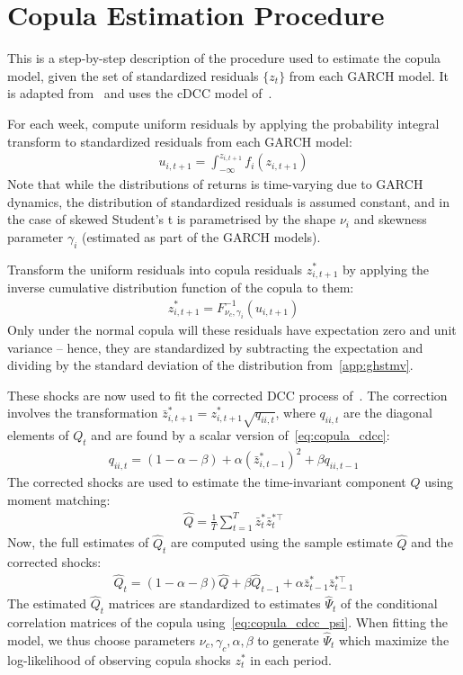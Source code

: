 
\section{Copula Estimation Procedure} %
\label{app:copula_cdcc}

This is a step-by-step description of the procedure used to estimate the copula model, given the set of standardized residuals $\{z_{t}\}$ from each GARCH model. It is adapted from~\textcite{ChristoffersenErrunzaJacobLanglois2012} and uses the cDCC model of~\textcite{Aielli2013}.

For each week, compute uniform residuals by applying the probability integral transform to standardized residuals from each GARCH model:
\begin{align}
  u_{i, t+1} = \int_{-\infty}^{z_{i,t+1}} f_{i}(z_{i,t+1})
\end{align}
Note that while the distributions of returns is time-varying due to GARCH dynamics, the distribution of standardized residuals is assumed constant, and in the case of skewed Student's t is parametrised by the shape $\nu_i$ and skewness parameter $\gamma_i$ (estimated as part of the GARCH models).

Transform the uniform residuals into copula residuals $z_{i,t+1}^*$ by applying the inverse cumulative distribution function of the copula to them:
\begin{align}
  z_{i,t+1}^* = F_{\nu_c,\gamma_i}^{-1}(u_{i,t+1})
\end{align}
Only under the normal copula will these residuals have expectation zero and unit variance -- hence, they are standardized by subtracting the expectation and dividing by the standard deviation of the distribution from~\autoref{app:ghstmv}.

These shocks are now used to fit the corrected DCC process of~\textcite{Aielli2013}. The correction involves the transformation $\bar{z}_{i,t+1}^* = z_{i,t+1}^* \sqrt{q_{ii,t}}$, where $q_{ii,t}$ are the diagonal elements of $Q_t$ and are found by a scalar version of~\autoref{eq:copula_cdcc}:
\begin{align}
  q_{ii,t} = (1 - \alpha - \beta)
    + \alpha (\bar{z}_{i,t-1}^*)^2
    + \beta q_{ii,t-1}
\end{align}
The corrected shocks are used to estimate the time-invariant component $Q$ using moment matching:
\begin{align}
  \hat{Q} = \frac{1}{T} \sum_{t=1}^T \bar{z}_{t}^* \bar{z}_t^{*\top}
\end{align}
Now, the full estimates of $\hat{Q}_t$ are computed using the sample estimate $\hat{Q}$ and the corrected shocks:
\begin{align}
  \hat{Q}_t = (1 - \alpha - \beta) \hat{Q}
    + \beta \hat{Q}_{t-1}
    + \alpha \bar{z}_{t-1}^* \bar{z}_{t-1}^{*\top}
\end{align}
The estimated $\hat{Q}_t$ matrices are standardized to estimates $\hat{\Psi}_t$ of the conditional correlation matrices of the copula using~\autoref{eq:copula_cdcc_psi}. When fitting the model, we thus choose parameters $\nu_c, \gamma_c, \alpha, \beta$ to generate $\hat{\Psi}_t$ which maximize the log-likelihood of observing copula shocks $z_t^*$ in each period.

